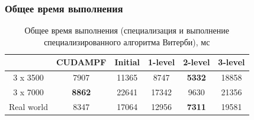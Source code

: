 \documentclass{beamer}
\newcommand{\backupend}{
   \setcounter{framenumber}{\value{finalframe}}
}
\begin{document}
\begin{frame}[fragile]
	\frametitle{Общее время выполнения}
	\begin{table}[t!]
  \centering
  \begin{tabular}{||c c c c c c||} 
    \hline
    & CUDAMPF & Initial & 1-level & 2-level & 3-level\\ [0.5ex] 
    \hline\hline
    3 x 3500 & 7907 & 11365 & 8747 & \textbf{5332} & 18858 \\ 
    \hline
    3 x 7000 & \textbf{8862} & 22641 & 17342 & 9630 & 21356 \\
    \hline
    Real world & 8347 & 17064 & 12956 & \textbf{7311} & 19581 \\
    \hline
  \end{tabular}
  \caption{Общее время выполнения (специализация и выполнение специализированного алгоритма Витерби), мс}
  \label{runtime}
\end{table}
\end{frame}


\backupend
\end{document}
